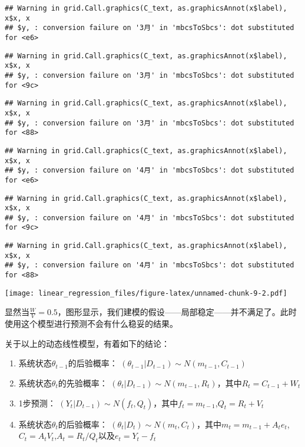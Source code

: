 \documentclass[]{ctexart}
\providecommand{\tightlist}{%
  \setlength{\itemsep}{0pt}\setlength{\parskip}{0pt}}
\begin{document}
\begin{verbatim}
## Warning in grid.Call.graphics(C_text, as.graphicsAnnot(x$label), x$x, x
## $y, : conversion failure on '3月' in 'mbcsToSbcs': dot substituted for <e6>
\end{verbatim}

\begin{verbatim}
## Warning in grid.Call.graphics(C_text, as.graphicsAnnot(x$label), x$x, x
## $y, : conversion failure on '3月' in 'mbcsToSbcs': dot substituted for <9c>
\end{verbatim}

\begin{verbatim}
## Warning in grid.Call.graphics(C_text, as.graphicsAnnot(x$label), x$x, x
## $y, : conversion failure on '3月' in 'mbcsToSbcs': dot substituted for <88>
\end{verbatim}

\begin{verbatim}
## Warning in grid.Call.graphics(C_text, as.graphicsAnnot(x$label), x$x, x
## $y, : conversion failure on '4月' in 'mbcsToSbcs': dot substituted for <e6>
\end{verbatim}

\begin{verbatim}
## Warning in grid.Call.graphics(C_text, as.graphicsAnnot(x$label), x$x, x
## $y, : conversion failure on '4月' in 'mbcsToSbcs': dot substituted for <9c>
\end{verbatim}

\begin{verbatim}
## Warning in grid.Call.graphics(C_text, as.graphicsAnnot(x$label), x$x, x
## $y, : conversion failure on '4月' in 'mbcsToSbcs': dot substituted for <88>
\end{verbatim}

\texttt{[image: linear\_regression\_files/figure-latex/unnamed-chunk-9-2.pdf]}

显然当\(\frac{W}{V}=0.5\)，图形显示，我们建模的假设------局部稳定------并不满足了。此时使用这个模型进行预测不会有什么稳妥的结果。

关于以上的动态线性模型，有着如下的结论：

\begin{enumerate}
\def\labelenumi{\arabic{enumi}.}
\tightlist
\item
  系统状态\(\theta_{t-1}\)的后验概率：
  \((\theta_{t-1}|D_{t-1})\sim N(m_{t-1},C_{t-1})\)
\item
  系统状态\(\theta_{t}\)的先验概率：
  \((\theta_t|D_{t-1})\sim N(m_{t-1},R_t)\)，其中\(R_t = C_{t-1}+W_t\)
\item
  1步预测：
  \((Y_t|D_{t-1})\sim N(f_t,Q_t)\)，其中\(f_t = m_{t-1}\),\(Q_t=R_t + V_t\)
\item
  系统状态\(\theta_t\)的后验概率：
  \((\theta_t|D_t)\sim N(m_t,C_t)\)，其中\(m_t = m_{t-1} + A_t e_t\),\(C_t = A_tV_t\),\(A_t = R_t/Q_t\)以及\(e_t=Y_t-f_t\)
\end{enumerate}
\end{document}
